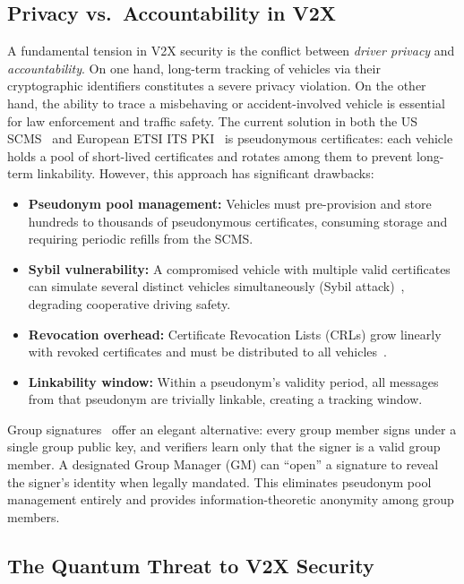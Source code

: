 \documentclass[conference,10pt]{IEEEtran}
\begin{document}
\subsection{Privacy vs.\ Accountability in V2X}

A fundamental tension in V2X security is the conflict between \emph{driver privacy} and \emph{accountability}. On one hand, long-term tracking of vehicles via their cryptographic identifiers constitutes a severe privacy violation. On the other hand, the ability to trace a misbehaving or accident-involved vehicle is essential for law enforcement and traffic safety. The current solution in both the US SCMS~\cite{whyte2013, brecht2018} and European ETSI ITS PKI~\cite{etsits103097} is pseudonymous certificates: each vehicle holds a pool of short-lived certificates and rotates among them to prevent long-term linkability. However, this approach has significant drawbacks:

\begin{itemize}
    \item \textbf{Pseudonym pool management:} Vehicles must pre-provision and store hundreds to thousands of pseudonymous certificates, consuming storage and requiring periodic refills from the SCMS.
    \item \textbf{Sybil vulnerability:} A compromised vehicle with multiple valid certificates can simulate several distinct vehicles simultaneously (Sybil attack)~\cite{douceur2002}, degrading cooperative driving safety.
    \item \textbf{Revocation overhead:} Certificate Revocation Lists (CRLs) grow linearly with revoked certificates and must be distributed to all vehicles~\cite{petit2015}.
    \item \textbf{Linkability window:} Within a pseudonym's validity period, all messages from that pseudonym are trivially linkable, creating a tracking window.
\end{itemize}

Group signatures~\cite{bellare2003, boneh2004} offer an elegant alternative: every group member signs under a single group public key, and verifiers learn only that the signer is a valid group member. A designated Group Manager (GM) can ``open'' a signature to reveal the signer's identity when legally mandated. This eliminates pseudonym pool management entirely and provides information-theoretic anonymity among group members.

\subsection{The Quantum Threat to V2X Security}
\end{document}
